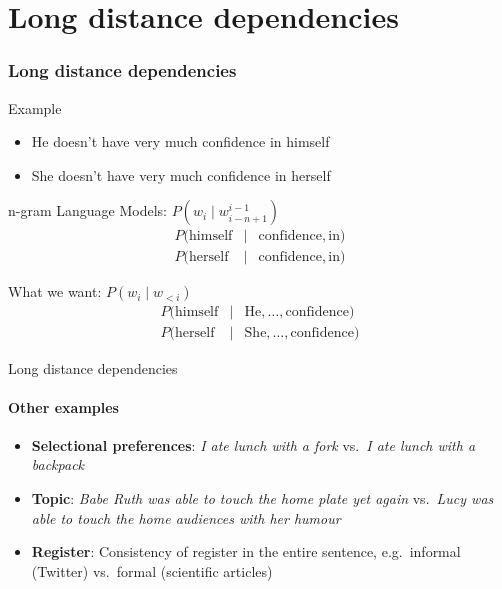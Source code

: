 



\section{Long distance dependencies}

\begin{frame}
\frametitle{Long distance dependencies}
\begin{block}{Example}
\begin{itemize}[<+->]
\item {\color{blue} He} doesn't have very much confidence in {\color{blue} himself}
\item {\color{blue} She} doesn't have very much confidence in {\color{blue} herself}
\end{itemize}

\pause
\end{block}
\begin{block}{n-gram Language Models: $P(w_i \mid w_{i-n+1}^{i-1})$}
\begin{eqnarray*}
P(\text{himself} &\mid& \text{confidence}, \text{in} ) \\
P(\text{herself} &\mid& \text{confidence}, \text{in} ) 
\end{eqnarray*}
\end{block}

\pause
\begin{block}{What we want: $P(w_i \mid w_{<i})$}
\begin{eqnarray*}
P(\text{himself} &\mid& \text{He}, \ldots, \text{confidence} ) \\
P(\text{herself} &\mid& \text{She}, \ldots, \text{confidence} ) 
\end{eqnarray*}
\end{block}
\end{frame}

\begin{frame}{Long distance dependencies}
\framesubtitle{Other examples}	
\begin{itemize}[<+->]
	\item \textbf{Selectional preferences}: \textit{I ate lunch with a {\color{blue} fork}} vs.\ \textit{I ate lunch with a {\color{blue} backpack}}
	\item \textbf{Topic}: \textit{Babe Ruth was able to touch the home {\color{blue} plate} yet again} vs.\ \textit{Lucy was able to touch the home {\color{blue} audiences} with her humour}
	\item \textbf{Register}: Consistency of register in the entire sentence, e.g.\ informal (Twitter) vs.\ formal (scientific articles)
\end{itemize}
\end{frame}


